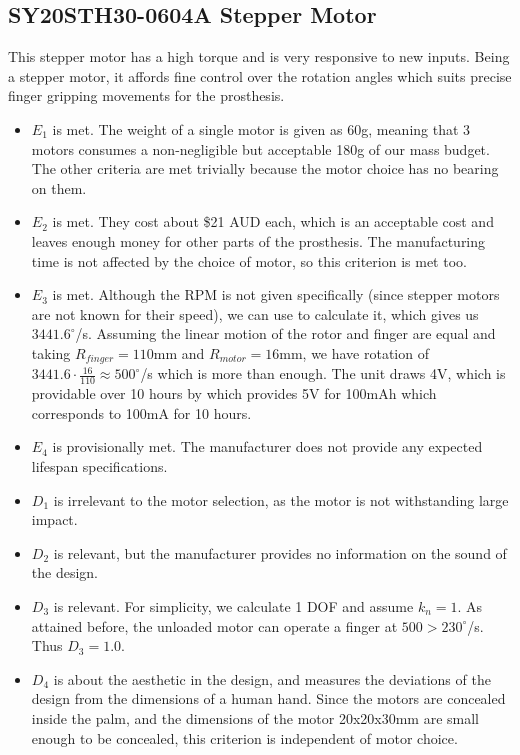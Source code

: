 \documentclass[11pt,3p]{report}
\begin{document}
\begin{multicols}{2}
\begin{itemize}
		\end{itemize}
		
		\subsection{SY20STH30-0604A Stepper Motor}

		This stepper motor has a high torque and is very responsive to new inputs. Being a stepper motor, it affords fine control
		over the rotation angles which suits precise finger gripping movements for the prosthesis.

		\begin{itemize}
		    \item[\checkmark] $E_1$ is met. The weight of a single motor is given as 60g, meaning that 3 motors consumes a non-negligible but acceptable 180g of our mass budget. The other criteria are met trivially because the motor choice has no bearing on them.
		    \item[\checkmark] $E_2$ is met. They cost about \$21 AUD each, which is an acceptable cost and leaves enough money for other parts of the prosthesis. The manufacturing time is not affected by the choice of motor, so this criterion is met too.
		    \item[\checkmark] $E_3$ is met. Although the RPM is not given specifically (since stepper motors are not known for their speed), we can use \cite{stepcalc} to calculate it, which gives us $3441.6^\circ$/s. Assuming the linear motion of the rotor and finger are equal and taking $R_{finger} = 110$mm and $R_{motor} = 16$mm, we have rotation of $3441.6\cdot\frac{16}{110} \approx 500^\circ$/s which is more than enough. The unit draws 4V, which is providable over 10 hours by \cite{coreelectronics} which provides 5V for 100mAh which corresponds to 100mA for 10 hours. 
		    \item[\checkmark] $E_4$ is provisionally met. The manufacturer does not provide any expected lifespan specifications.
		    \item $D_1$ is irrelevant to the motor selection, as the motor is not withstanding large impact.
		    \item $D_2$ is relevant, but the manufacturer provides no information on the sound of the design.
		    \item $D_3$ is relevant. For simplicity, we calculate 1 DOF and assume $k_n = 1$. As attained before, the unloaded motor can operate a finger at $500 > 230^\circ$/s. Thus $D_3 = 1.0$.
		    \item $D_4$ is about the aesthetic in the design, and measures the deviations of the design from the dimensions of a
		    human hand. Since the motors are concealed inside the palm, and the dimensions of the motor 20x20x30mm are small enough to be concealed, this criterion is independent of motor choice.
		 \end{itemize}

\end{multicols}
\end{document}
